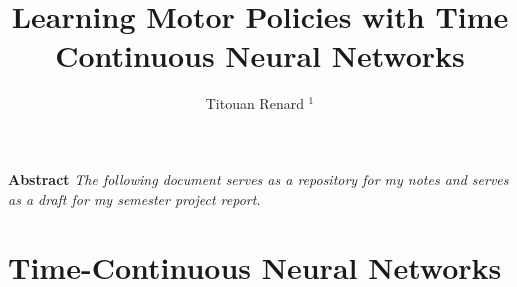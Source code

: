 \documentclass{two-col-epfl}
\begin{document}

\title{Learning Motor Policies with Time Continuous Neural Networks}

\author{Titouan Renard $^1$}

\address{}
\maketitle








\textbf{Abstract}
\textit{The following document serves as a repository for my notes and serves as a draft for my semester project report.}

\section{Time-Continuous Neural Networks}




\printbibliography
\end{document}
